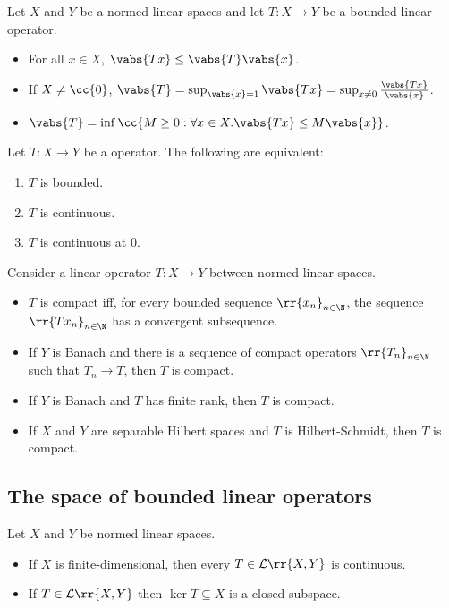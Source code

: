 \documentclass{article}
\begin{document}
\begin{theorem}
  Let $X$ and $Y$ be a normed linear spaces and let $T:X\to Y$ be a bounded linear operator.
  \begin{itemize}
    \item For all $x\in X$, $\vabs{Tx}\leq \vabs{T}\vabs{x}$.
    \item If $X\neq\cc{0}$, $\vabs{T}=\sup_{\vabs{x}=1}\vabs{Tx}=\sup_{x\neq 0}\frac{\vabs{Tx}}{\vabs{x}}$.
    \item $\vabs{T}=\inf\cc{M\geq 0 : \forall x \in X. \vabs{Tx}\leq M\vabs{x}}$.
  \end{itemize}
\end{theorem}

\begin{theorem}
  Let $T:X\to Y$ be a operator. The following are equivalent:
  \begin{enumerate}
    \item $T$ is bounded.
    \item $T$ is continuous.
    \item $T$ is continuous at $0$.
  \end{enumerate}
\end{theorem}

\begin{theorem}
  Consider a linear operator $T:X\to Y$ between normed linear spaces.
  \begin{itemize}
    \item $T$ is compact iff, for every bounded sequence $\rr{x_n}_{n\in\N}$,
      the sequence $\rr{Tx_n}_{n\in\N}$ has a convergent subsequence.
    \item If $Y$ is Banach and there is a sequence of compact operators
      $\rr{T_n}_{n\in\N}$ such that $T_n\to T$, then $T$ is compact.
    \item If $Y$ is Banach and $T$ has finite rank, then $T$ is compact.
    \item If $X$ and $Y$ are separable Hilbert spaces and $T$ is
      Hilbert-Schmidt, then $T$ is compact.
  \end{itemize}
\end{theorem}

\subsection{The space of bounded linear operators}

\begin{theorem}
  Let $X$ and $Y$ be normed linear spaces.
  \begin{itemize}
    \item If $X$ is finite-dimensional, then every $T\in\mathcal L\rr{X,Y}$ is
      continuous.
    \item If $T\in\mathcal L\rr{X,Y}$ then $\ker T\subseteq X$ is a
      closed subspace.
  \end{itemize}
\end{theorem}
\end{document}

